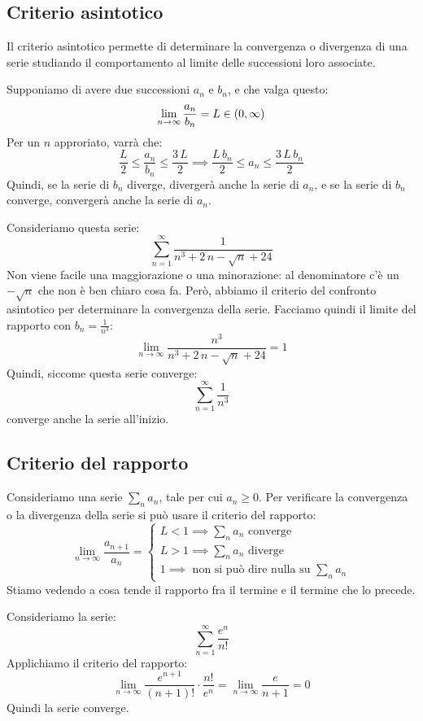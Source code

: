 \subsection{Criterio asintotico}

Il criterio asintotico permette di determinare la convergenza o divergenza di una serie studiando il comportamento al limite delle successioni loro associate.

Supponiamo di avere due successioni $a_n$ e $b_n$, e che valga questo:
\[
\lim_{n \to \infty} \frac{a_n}{b_n} = L \in \ooint{0}{\infty}
\]
Per un $n$ approriato, varr\`a che:
\[
\frac{L}{2} \le \frac{a_n}{b_n} \le \frac{3 \, L}{2}
\implies
\frac{L \, b_n}{2} \le a_n \le \frac{3 \, L \, b_n}{2}
\]
Quindi, se la serie di $b_n$ diverge, diverger\`a anche la serie di $a_n$, e se la serie di $b_n$ converge, converger\`a anche la serie di $a_n$.

\begin{exmp}
Consideriamo questa serie:
\[
\sum_{n = 1}^{\infty} \frac{1}{n^3 + 2 \, n - \sqrt{n} + 24}
\]
Non viene facile una maggiorazione o una minorazione: al denominatore c'\`e un $- \sqrt{n}$ che non \`e ben chiaro cosa fa. Per\`o, abbiamo il criterio del confronto asintotico per determinare la convergenza della serie. Facciamo quindi il limite del rapporto con $b_n = \frac{1}{n^3}$:
\[
\lim_{n \to \infty} \frac{n^3}{n^3 + 2 \, n - \sqrt{n} + 24} = 1
\]
Quindi, siccome questa serie converge:
\[
\sum_{n = 1}^{\infty} \frac{1}{n^3}
\]
converge anche la serie all'inizio.
\end{exmp}

\subsection{Criterio del rapporto}

Consideriamo una serie $\sum_{n} a_n$, tale per cui $a_n \ge 0$. Per verificare la convergenza o la divergenza della serie si pu\`o usare il criterio del rapporto:
\[
\lim_{n \to \infty} \frac{a_{n+1}}{a_n} = 
\begin{cases}
L < 1 \implies \sum_{n} a_n \text{ converge} \\
L > 1 \implies \sum_{n} a_n \text{ diverge} \\
1 \implies \text{ non si pu\`o dire nulla su } \sum_{n} a_n
\end{cases}
\]
Stiamo vedendo a cosa tende il rapporto fra il termine e il termine che lo precede.

\begin{exmp}
Consideriamo la serie:
\[
\sum_{n = 1}^{\infty} \frac{e^n}{n!}
\]
Applichiamo il criterio del rapporto:
\[
\lim_{n \to \infty} \frac{e^{n+1}}{(n+1)!} \cdot \frac{n!}{e^n} = 
\lim_{n \to \infty} \frac{e}{n+1} = 0
\]
Quindi la serie converge.
\end{exmp}

